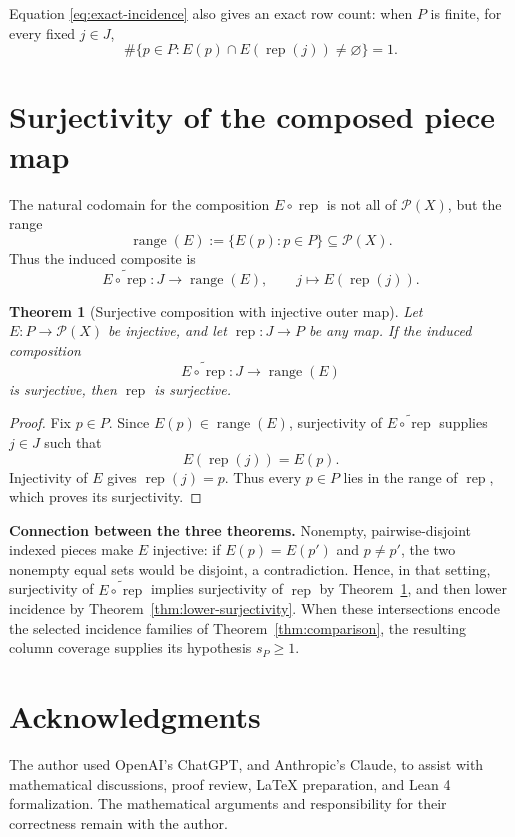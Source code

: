 \documentclass[11pt, letterpaper]{nyjm}
\newtheorem{theorem}{Theorem}[section]
\newcommand{\range}{\operatorname{range}}
\newcommand{\rep}{\operatorname{rep}}
\begin{document}
	\noindent
	Equation \eqref{eq:exact-incidence} also gives an exact row count:
	when $P$ is finite, for every fixed $j\in J$,
	\[
	\#\{p\in P:E(p)\cap E(\rep(j))\ne\varnothing\}=1.
	\]
	
	
	\section{Surjectivity of the composed piece map}
	
	The natural codomain for the composition $E\circ\rep$ is not all of
	$\mathcal P(X)$, but the range
	\[
	\range(E):=\{E(p):p\in P\}\subseteq\mathcal P(X).
	\]
	Thus the induced composite is
	\[
	\widetilde{E\circ\rep}:J\longrightarrow\range(E),
	\qquad j\longmapsto E(\rep(j)).
	\]
	
	\begin{theorem}[Surjective composition with injective outer
		map]\label{thm:composite}
		Let $E:P\to\mathcal P(X)$ be injective, and let
		$\rep:J\to P$ be any map. If the induced composition
		\[
		\widetilde{E\circ\rep}:J\longrightarrow\range(E)
		\]
		is surjective, then $\rep$ is surjective.
	\end{theorem}
	
	\begin{proof}
		Fix $p\in P$. Since $E(p)\in\range(E)$, surjectivity of
		$\widetilde{E\circ\rep}$ supplies $j\in J$ such that
		\[
		E(\rep(j))=E(p).
		\]
		Injectivity of $E$ gives $\rep(j)=p$. Thus every $p\in P$ lies in
		the range of $\rep$, which proves its surjectivity.
	\end{proof}
	
	\noindent
	\textbf{Connection between the three theorems.}
	Nonempty, pairwise-disjoint indexed pieces make $E$ injective: if
	$E(p)=E(p')$ and $p\ne p'$, the two nonempty equal sets would be
	disjoint, a contradiction. Hence, in that setting, surjectivity of
	$\widetilde{E\circ\rep}$ implies surjectivity of $\rep$ by
	Theorem~\ref{thm:composite}, and then lower incidence by
	Theorem~\ref{thm:lower-surjectivity}. When these intersections encode the
	selected incidence families of Theorem~\ref{thm:comparison}, the
	resulting column coverage supplies its hypothesis $s_P\geq1$.
	
	
	
	\section*{Acknowledgments}
	
	The author used OpenAI's ChatGPT, and Anthropic's Claude, to assist with
	mathematical discussions, proof review, LaTeX
	preparation, and Lean 4 formalization.
	The mathematical arguments and responsibility
	for their correctness remain with the author.
	
\end{document}
